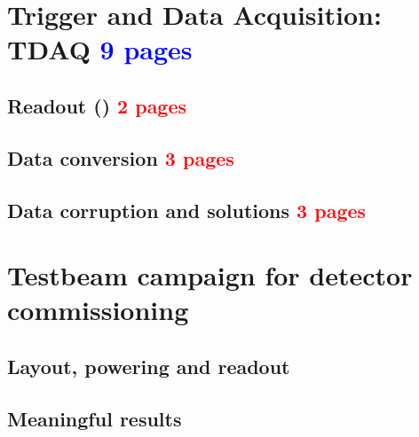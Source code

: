 	\clearpage
	\section{Trigger and Data Acquisition: TDAQ \textcolor{blue}{ 9 pages}}
		\subsection{Readout () \textcolor{red}{ 2 pages}}
		\subsection{Data conversion \textcolor{red}{ 3 pages}}
		\subsection{Data corruption and solutions  \textcolor{red}{ 3 pages}}
		
	\clearpage
	\section{Testbeam campaign for detector commissioning}
		\subsection{Layout, powering and readout}
		\subsection{Meaningful results}
		
		
		
		
		
		
		
		
		
		
		
		
		
		
		
		
		
		
		
		
		
		
		
		
		
		
		
		
		
		
		
		
		
		
		
		
		
		
		
		
		
		
		
		
		
		
		
		
		
		
		
		
		
		
		
		
		
		
		
		
